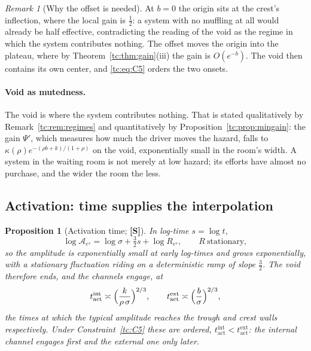 \documentclass[11pt]{article}
\numberwithin{equation}{section}
\theoremstyle{plain}
\newtheorem{proposition}[theorem]{Proposition}
\theoremstyle{definition}
\theoremstyle{remark}
\newtheorem{remark}[theorem]{Remark}
\newcommand{\Ac}{\mathcal{A}}
\begin{document}
\begin{remark}[Why the offset is needed]\label{tc:rem:whyoffset}
At $b=0$ the origin sits at the crest's inflection, where the local gain
is $\tfrac12$: a system with no muffling at all would already be half
effective, contradicting the reading of the void as the regime in which
the system contributes nothing. The offset moves the origin into the
plateau, where by Theorem~\ref{tc:thm:gain}(iii) the gain is $O(e^{-b})$.
The void then contains its own center, and \eqref{tc:eq:C5} orders the
two onsets.
\end{remark}

\paragraph{Void as mutedness.}\label{tc:rem:mutedness}
The void is where the system contributes nothing. That is stated
qualitatively by Remark~\ref{tc:rem:regimes} and quantitatively by
Proposition~\ref{tc:prop:mingain}: the gain $\Psi'$, which measures how
much the driver moves the hazard, falls to
$\kappa(\rho)e^{-(\rho b+k)/(1+\rho)}$ on the void, exponentially small
in the room's width. A system in the waiting room is not merely at low hazard;
its efforts have almost no purchase, and the wider the room the less.

\subsection{Activation: time supplies the interpolation}
\label{tc:subsub:activation}

\begin{proposition}[Activation time; \textbf{[S]}]\label{tc:prop:tact}
In log-time $s=\log t$,
\begin{equation}\label{tc:eq:logamp}
\log\Ac_{e^{s}}=\log\sigma+\tfrac32s+\log R_{e^{s}},
\qquad R\ \text{stationary},
\end{equation}
so the amplitude is exponentially small at early log-times and grows
exponentially, with a stationary fluctuation riding on a deterministic
ramp of slope $\tfrac32$. The void therefore ends, and the channels
engage, at
\begin{equation}\label{tc:eq:tact}
t^{\mathrm{int}}_{\mathrm{act}}\asymp\Bigl(\frac{k}{\rho\,\sigma}
\Bigr)^{2/3},
\qquad
t^{\mathrm{ext}}_{\mathrm{act}}\asymp\Bigl(\frac{b}{\sigma}\Bigr)^{2/3},
\end{equation}
the times at which the typical amplitude reaches the trough and crest
walls respectively. Under Constraint~\ref{tc:C5} these are ordered,
$t^{\mathrm{int}}_{\mathrm{act}}<t^{\mathrm{ext}}_{\mathrm{act}}$: the
internal channel engages first and the external one only later.
\end{proposition}
\end{document}
